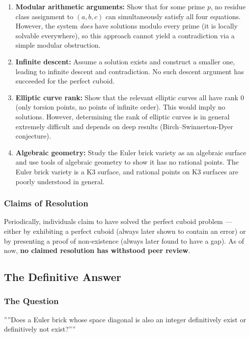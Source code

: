 \documentclass[10pt,a4paper]{article}
\begin{document}
\begin{enumerate}
    \item \textbf{Modular arithmetic arguments:} Show that for some prime $p$, no residue class assignment to $(a, b, c)$ can simultaneously satisfy all four equations. However, the system \emph{does} have solutions modulo every prime (it is locally solvable everywhere), so this approach cannot yield a contradiction via a simple modular obstruction.
    \item \textbf{Infinite descent:} Assume a solution exists and construct a smaller one, leading to infinite descent and contradiction. No such descent argument has succeeded for the perfect cuboid.
    \item \textbf{Elliptic curve rank:} Show that the relevant elliptic curves all have rank 0 (only torsion points, no points of infinite order). This would imply no solutions. However, determining the rank of elliptic curves is in general extremely difficult and depends on deep results (Birch--Swinnerton-Dyer conjecture).
    \item \textbf{Algebraic geometry:} Study the Euler brick variety as an algebraic surface and use tools of algebraic geometry to show it has no rational points. The Euler brick variety is a K3 surface, and rational points on K3 surfaces are poorly understood in general.
\end{enumerate}

\subsubsection{Claims of Resolution}

Periodically, individuals claim to have solved the perfect cuboid problem --- either by exhibiting a perfect cuboid (always later shown to contain an error) or by presenting a proof of non-existence (always later found to have a gap). As of now, \textbf{no claimed resolution has withstood peer review}.

\subsection{The Definitive Answer}

\subsubsection{The Question}

''''Does a Euler brick whose space diagonal is also an integer definitively exist or definitively not exist?''''
\end{document}

